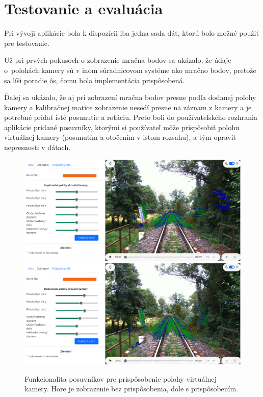 \chapter{Testovanie a evaluácia}

Pri vývoji aplikácie bola k dispozícii iba jedna sada dát, ktorú bolo možné použiť pre testovanie.

Už pri prvých pokusoch o zobrazenie mračna bodov sa ukázalo, že údaje o~polohách kamery sú v inom súradnicovom systéme ako mračno bodov, pretože sa líši poradie ôs, čomu bola implementácia prispôsobená.

Ďalej sa ukázalo, že aj pri zobrazení mračna bodov presne podľa dodanej polohy kamery a kalibračnej matice zobrazenie nesedí presne na záznam z kamery a je potrebné pridať isté posunutie a rotáciu. Preto boli do používateľského rozhrania aplikácie pridané posuvníky, ktorými si používateľ môže prispôsobiť polohu virtuálnej kamery (posunutím a otočením v istom rozsahu), a tým opraviť nepresnosti v dátach.

\begin{figure}[h]
    \centering
    \includegraphics[width=0.9\linewidth]{text_prace/obrazky-figures/posuvniky1.png}
    \includegraphics[width=0.9\linewidth]{text_prace/obrazky-figures/posuvniky2.png}
    \caption{Funkcionalita posuvníkov pre prispôsobenie polohy virtuálnej kamery. Hore je zobrazenie bez prispôsobenia, dole s prispôsobením.}
    \label{fig:posuvniky}
\end{figure}


